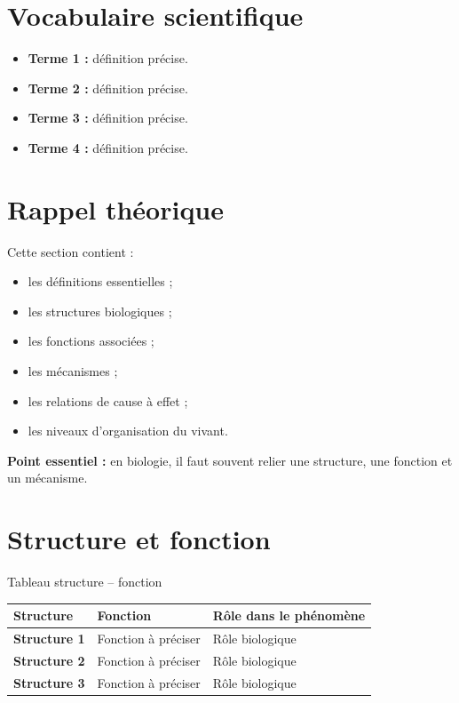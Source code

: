 \documentclass[11pt,a4paper]{article}
\begin{document}
\section{Vocabulaire scientifique}

\begin{cadretheorie}
\begin{itemize}
    \item \textbf{Terme 1 :} définition précise.
    \item \textbf{Terme 2 :} définition précise.
    \item \textbf{Terme 3 :} définition précise.
    \item \textbf{Terme 4 :} définition précise.
\end{itemize}
\end{cadretheorie}

\section{Rappel théorique}

\begin{cadretheorie}
Cette section contient :
\begin{itemize}
    \item les définitions essentielles ;
    \item les structures biologiques ;
    \item les fonctions associées ;
    \item les mécanismes ;
    \item les relations de cause à effet ;
    \item les niveaux d’organisation du vivant.
\end{itemize}

\medskip

\textbf{Point essentiel :} en biologie, il faut souvent relier une structure, une fonction et un mécanisme.
\end{cadretheorie}

\section{Structure et fonction}

\begin{cadregris}{Tableau structure -- fonction}
\renewcommand{\arraystretch}{1.35}
\begin{tabularx}{\textwidth}{>{\bfseries}p{3.5cm}X X}
\toprule
Structure & Fonction & Rôle dans le phénomène \\
\midrule
Structure 1 & Fonction à préciser & Rôle biologique \\
Structure 2 & Fonction à préciser & Rôle biologique \\
Structure 3 & Fonction à préciser & Rôle biologique \\
\bottomrule
\end{tabularx}
\end{cadregris}
\end{document}
